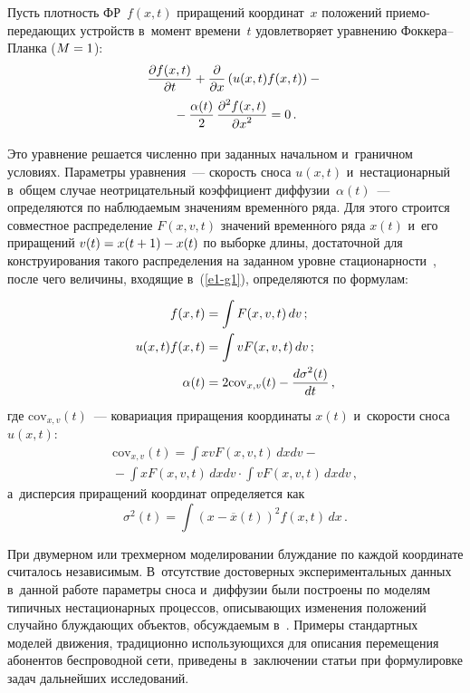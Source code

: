 \begin{multicols}{2}
  Пусть плотность ФР~$f(x,t)$ приращений 
координат~$x$ положений при\-емо-пе\-ре\-да\-ющих устройств в~момент 
времени~$t$ удовле\-тво\-ря\-ет уравнению Фок\-ке\-ра--План\-ка ($M\hm=1$):
  \begin{multline}
  \displaystyle\frac{\displaystyle \partial f(x,t)\mathstrut}{\displaystyle \partial t\mathstrut} +\displaystyle\frac{\displaystyle \partial\mathstrut}{\displaystyle \partial x\mathstrut}\left( u(x,t) 
  f(x,t)\right)- {}\\
  {}-
\displaystyle\frac{\displaystyle \alpha(t)\mathstrut}{\displaystyle 2\mathstrut} \,\displaystyle\frac{\displaystyle \partial^2 f(x,t)\mathstrut}{\displaystyle \partial x^2\mathstrut}=0\,.
  \label{e1-g1}
  \end{multline}
  
  Это уравнение решается численно при заданных начальном и~граничном 
условиях. Параметры уравнения~--- скорость сноса $u(x,t)$ и~нестационарный 
в~общем случае неотрицательный коэффициент диффузии~$\alpha(t)$~--- 
определяются по наблюдаемым значениям временн$\acute{\mbox{о}}$го ряда. Для этого строится 
совместное распределение $F(x,v,t)$ значений временн$\acute{\mbox{о}}$го ряда $x(t)$ и~его 
приращений $v(t)\hm= x(t+1)\hm- x(t)$ по выборке длины, достаточной для 
конструирования такого распределения на заданном уровне 
стационарности~\cite{17-g1}, после чего величины, входящие в~(\ref{e1-g1}), 
определяются по формулам:

\noindent
  \begin{align*}
    f(x,t) &=\displaystyle \int F(x,v,t)\,dv\,;\\
  u(x,t) f(x,t) &= \displaystyle \int vF(x,v,t)\,dv\,;\\
  \alpha(t) &= 2\mathrm{cov}_{x,v}(t) -\displaystyle\frac{\displaystyle d\sigma^2(t)\mathstrut}{\displaystyle dt\mathstrut}\,,
  \end{align*}
где $\mathrm{cov}_{x,v}(t)$~--- ковариация приращения координаты $x(t)$ и~скорости сноса $u(x,t)$:
\begin{multline*}
\mathrm{cov}_{x,v}(t)=\int xv F(x,v,t)\,dx dv -{}\\
{}- \int xF(x,v,t)\, dx dv  \cdot \int vF(x,v,t)\,dx dv\,,
\end{multline*}
а~дисперсия приращений координат определяется как 
$$
\sigma^2(t)= \int  \left(x-\overline{x}(t)\right)^2 f(x,t)\,dx\,.
$$

При двумерном или трехмерном 
моделировании блуж\-да\-ние по каждой координате считалось независимым. 
В~отсутствие достоверных экспериментальных данных в~данной работе 
параметры сноса и~диффузии были построены по моделям типичных 
нестационарных процессов, описывающих изменения положений случайно 
блуждающих объектов, обсуждаемым в~\cite{17-g1}. Примеры стандартных 
моделей движения, традиционно использующихся для описания перемещения 
абонентов беспроводной сети, приведены в~заключении статьи при 
формулировке задач дальнейших исследований. 


\end{multicols}
